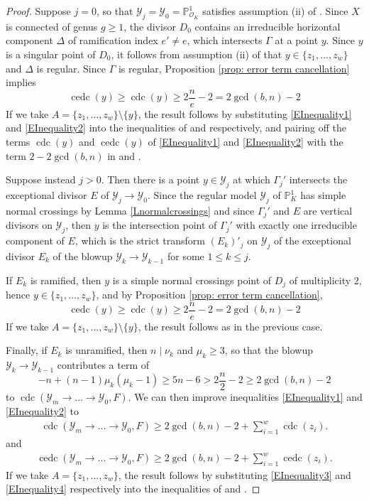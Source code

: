 \documentclass[12pt]{amsart}
\numberwithin{equation}{section}
\theoremstyle{definition}
\renewcommand{\O}{\mathcal{O}}
\renewcommand{\P}{\mathbb P}
\newcommand{\Y}{\mathcal{Y}}
\DeclareMathOperator{\cdc}{cdc}
\DeclareMathOperator{\cedc}{cedc}
\begin{document}
\begin{proof}
    Suppose $j=0$, so that $\Y_j=\Y_0=\P^1_{\O_K}$ satisfies assumption (ii) of . Since $X$ is connected of genus $g\geq1$, the divisor $D_0$ contains an irreducible horizontal component $\Delta$ of ramification index $e'\neq e$, which intersects $\Gamma$ at a point $y$. Since $y$ is a singular point of $D_0$, it follows from assumption (ii) of  that $y\in\{z_1,...,z_w\}$ and $\Delta$ is regular. Since $\Gamma$ is regular, Proposition \ref{prop: error term cancellation} implies \[\cedc(y)\geq \cdc(y)\geq 2\frac{n}{e}-2=2\gcd{(b,n)}-2\]
    If we take $A=\{z_1,...,z_w\}\setminus\{y\}$, the result follows by substituting \eqref{EInequality1} and \eqref{EInequality2} into the inequalities of  and  respectively, and pairing off the terms $\cdc(y)$ and $\cedc(y)$ of \eqref{EInequality1} and \eqref{EInequality2} with the term $2-2\gcd(b,n)$ in  and .
    
    Suppose instead $j>0$. Then there is a point $y\in \Y_j$ at which $\Gamma_j'$ intersects the exceptional divisor $E$ of $\Y_j\to\Y_0$. Since the regular model $\Y_j$ of $\P^1_K$ has simple normal crossings by Lemma \ref{Lnormalcrossings} and since $\Gamma_j'$ and $E$ are vertical divisors on $\Y_j$, then $y$ is the intersection point of $\Gamma_j'$ with exactly one irreducible component of $E$, which is the strict transform $(E_k)'_j$ on $\Y_j$ of the exceptional divisor $E_k$ of the blowup $\Y_k\to\Y_{k-1}$ for some $1\leq k\leq j$.
    
    If $E_k$ is ramified, then $y$ is a simple normal crossings point of $D_j$ of multiplicity $2$, hence $y\in\{z_1,...,z_w\}$, and by Proposition \ref{prop: error term cancellation}, \[\cedc(y)\geq \cdc(y)\geq 2\frac{n}{e}-2=2\gcd{(b,n)}-2\]
    If we take $A=\{z_1,...,z_w\}\setminus\{y\}$, the result follows as in the previous case.

    Finally, if $E_k$ is unramified, then $n\mid\nu_k$ and $\mu_k\geq 3$, so that the blowup $\Y_k\to\Y_{k-1}$ contributes a term of \[-n+(n-1)\mu_k(\mu_k-1)\geq 5n-6> 2\frac{n}{2}-2\geq 2\gcd(b,n)-2\] to $\cdc(\Y_m\to...\to\Y_0,F)$. We can then improve inequalities \ref{EInequality1} and \ref{EInequality2} to
    \begin{equation}\label{EInequality3}
    \begin{aligned}
    \cdc(\Y_m\to...\to\Y_0,F)\geq2\gcd(b,n)-2+\sum_{i=1}^w\cdc(z_i).
    \end{aligned}
    \end{equation}
    and
    \begin{equation}\label{EInequality4}
    \begin{aligned}
      \cedc(\Y_m\to...\to\Y_0,F)\geq2\gcd(b,n)-2+\sum_{i=1}^w\cedc(z_i).
    \end{aligned}
    \end{equation}
    If we take $A=\{z_1,...,z_w\}$, the result follows by substituting \eqref{EInequality3} and \eqref{EInequality4} respectively into the inequalities of  and .
\end{proof}
\end{document}
